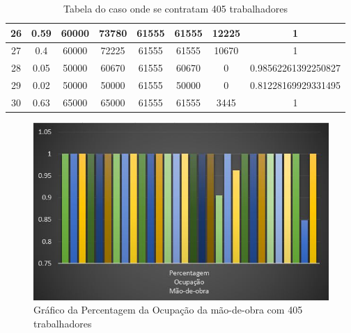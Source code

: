 \documentclass[10pt,a4paper,titlepage]{report}
\begin{document}
\begin{center}
\begin{table}
\begin{tabular}{ | c | c | c | c | c | c | c | c | }
		26 & 0.59 & 60000 & 73780 & 61555 & 61555 & 12225 & 1 \\ \hline
		27 & 0.4 & 60000 & 72225 & 61555 & 61555 & 10670 & 1 \\ \hline
		28 & 0.05 & 50000 & 60670 & 61555 & 60670 & 0 & 0.98562261392250827 \\ \hline
		29 & 0.02 & 50000 & 50000 & 61555 & 50000 & 0 & 0.81228169929331495 \\ \hline
		30 & 0.63 & 65000 & 65000 & 61555 & 61555 & 3445 & 1 \\ \hline
	\end{tabular}
\caption{Tabela do caso onde se contratam 405 trabalhadores}
\label{T1}
\end{table}

\begin{figure}[h]
\begin{center}
	\includegraphics[scale=1]{G1.png}
	\caption{Gráfico da Percentagem da Ocupação da mão-de-obra com 405 trabalhadores}
	\label{G1}
\end{center}
\end{figure}
\end{center}
\end{document}

